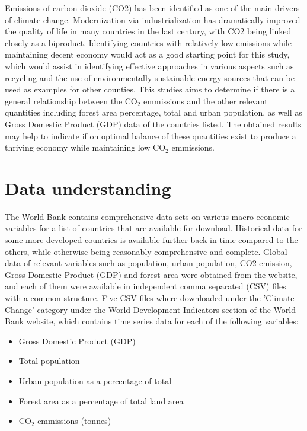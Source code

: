 \documentclass[11pt,a4paper,titlepage]{article}
\newcommand{\blankline}{\quad\pagebreak[2]}
\begin{document}
\blankline

Emissions of carbon dioxide (CO2) has been identified as one of the main drivers of climate change. Modernization via industrialization has dramatically improved the quality of life in many countries in the last century, with CO2 being linked closely as a biproduct. Identifying countries with relatively low emissions while maintaining decent economy would act as a good starting point for this study, which would assist in identifying effective approaches in various aspects such as recycling and the use of environmentally sustainable energy sources that can be used as examples for other counties. This studies aims to determine if there is a general relationship between the CO$_{2}$ emmissions and the other relevant quantities including forest area percentage, total and urban population, as well as Gross Domestic Product (GDP) data of the countries listed. The obtained results may help to indicate if on optimal balance of these quantities exist to produce a thriving economy while maintaining low CO$_{2}$ emmissions.

\blankline

\section{Data understanding}

\blankline

The \href{https://www.worldbank.org/}{World Bank} contains comprehensive data sets on various macro-economic variables for a list of countries that are available for download. Historical data for some more developed countries is available further back in time compared to the others, while otherwise being reasonably comprehensive and complete. Global data of relevant variables such as population, urban population, CO2 emission, Gross Domestic Product (GDP) and forest area were obtained from the website, and each of them were available in independent comma separated (CSV) files with a common structure. Five CSV files where downloaded under the 'Climate Change' category under the \href{https://data.worldbank.org/indicator}{World Development Indicators} section of the World Bank website, which contains time series data for each of the following variables:

\begin{itemize}
    \item{Gross Domestic Product (GDP)}
    \item{Total population}
    \item{Urban population as a percentage of total}
    \item{Forest area as a percentage of total land area}
    \item{CO$_2$ emmissions (tonnes)}
\end{itemize}
\end{document}
